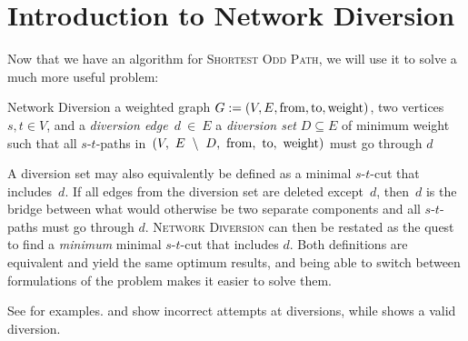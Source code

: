 \section{Introduction to Network Diversion}

Now that we have an algorithm for \textsc{Shortest Odd Path}, we will use it to solve a much more useful problem:

\problem
{Network Diversion}
{a weighted graph $G := (V, E, \operatorname{from}, \operatorname{to}, \operatorname{weight})$, two vertices $s,t \in V$, and a \emph{diversion edge}~$d~\in~E$}
{a \emph{diversion set} $D \subseteq E$ of minimum weight such that all $s$-$t$-paths in~$(V,~E~\setminus~D,~\operatorname{from},~\operatorname{to},~\operatorname{weight})$ must go through $d$}

A diversion set may also equivalently be defined as a minimal $s$-$t$-cut that includes~$d$. If all edges from the diversion set are deleted except~$d$, then~$d$ is the bridge between what would otherwise be two separate components and all $s$-$t$-paths must go through $d$. \textsc{Network Diversion} can then be restated as the quest to find a \emph{minimum} minimal $s$-$t$-cut that includes $d$. Both definitions are equivalent and yield the same optimum results, and being able to switch between formulations of the problem makes it easier to solve them.

See  for examples.  and  show incorrect attempts at diversions, while  shows a valid diversion.

